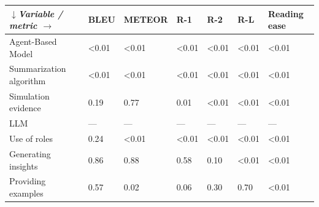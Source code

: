 \begin{tabular}{|l|l|l|l|l|l|l|}
\hline
\textit{$\downarrow$Variable / metric $\rightarrow$} & BLEU & METEOR & R-1 & R-2 & R-L & Reading ease \\
 \hline
 Agent-Based Model & \textless{}0.01 & \textless{}0.01 & \textless{}0.01 & \textless{}0.01 & \textless{}0.01 & \textless{}0.01 \\
 \hline
 Summarization algorithm & \textless{}0.01 & \textless{}0.01 & \textless{}0.01 & \textless{}0.01 & \textless{}0.01 & \textless{}0.01 \\
 \hline
 Simulation evidence & 0.19 & 0.77 & 0.01 & \textless{}0.01 & \textless{}0.01 & \textless{}0.01 \\
 \hline
 LLM & — & — & — & — & — & — \\
 \hline
 Use of roles & 0.24 & \textless{}0.01 & \textless{}0.01 & \textless{}0.01 & \textless{}0.01 & \textless{}0.01 \\
 \hline
 Generating insights & 0.86 & 0.88 & 0.58 & 0.10 & \textless{}0.01 & \textless{}0.01 \\
 \hline
 Providing examples & 0.57 & 0.02 & 0.06 & 0.30 & 0.70 & \textless{}0.01 \\
\hline
\end{tabular}
